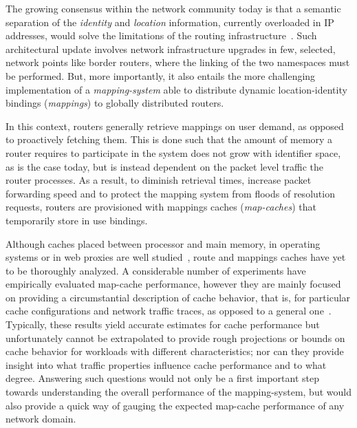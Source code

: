 

The growing consensus within the network community today is that a semantic
separation of the \emph{identity} and \emph{location} information, currently
overloaded in IP addresses, would solve the limitations of the routing
infrastructure~\cite{huston:potaroo,rfc4984}. Such architectural update
involves network infrastructure upgrades in few, selected, network points like
border routers, where the linking of the two namespaces must be performed.
But, more importantly, it also entails the more challenging implementation of a
\emph{mapping-system} able to distribute dynamic location-identity bindings
(\emph{mappings}) to globally distributed routers.    

In this context, routers generally retrieve mappings on user demand, as
opposed to proactively fetching them. This is done such that the amount of
memory a router requires to participate in the system does not grow with
identifier space, as is the case today, but is instead dependent on the packet
level traffic the router processes. As a result, to diminish retrieval times,
increase packet forwarding speed and to protect the mapping system from floods
of resolution requests, routers are provisioned with mappings caches
(\emph{map-caches}) that temporarily store in use bindings. 



Although caches placed between processor and main memory, in operating systems
or in web proxies are well studied~\cite{agarwal:cmodel, breslau:webcache,
rizzo:proxycache}, route and mappings caches have yet to be thoroughly
analyzed. A considerable number of experiments have empirically evaluated
map-cache performance, however they are mainly focused on providing a
circumstantial description of cache behavior, that is, for particular cache
configurations and network traffic traces, as opposed to a general
one~\cite{iannone:lcache, jkim:lcache, kim:rcaching, jakab:lisp-tree,
zhang:lcache}. Typically, these results yield accurate estimates for cache
performance but unfortunately cannot be extrapolated to provide rough
projections or bounds on cache behavior for workloads with different characteristics; nor can
they provide insight into what traffic properties influence cache performance
and to what degree.
Answering such questions would not only be a first important step towards
understanding the overall performance of the mapping-system, but would also 
provide a quick way of gauging the expected map-cache performance of any
network domain. 








